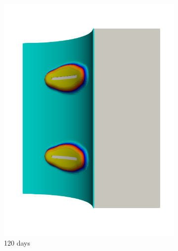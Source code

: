 \begin{figure}[!htb]
\begin{subfigure}[b]{0.2\textwidth}
    \includegraphics[width=\textwidth]{Chapter5/figures/spallation/seed_c_3}
    \caption{120 days}
  \end{subfigure}
  \begin{subfigure}[b]{0.2\textwidth}
    \centering

\end{subfigure}
\end{figure}
